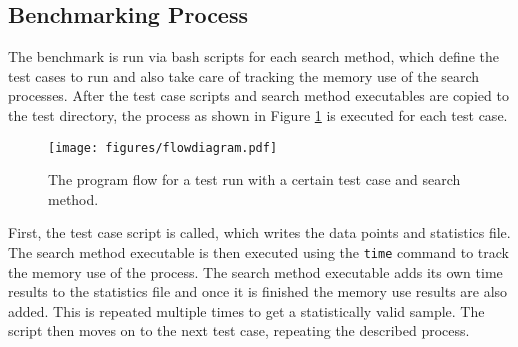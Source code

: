 \subsection{Benchmarking Process}

The benchmark is run via bash scripts for each search method, which define the test cases to run and also take care of tracking the memory use of the search processes. After the test case scripts and search method executables are copied to the test directory, the process as shown in Figure \ref{FIG:BENCHMARKING} is executed for each test case.

\begin{figure}[h]
	\centering
	\texttt{[image: figures/flowdiagram.pdf]}
	\caption{The program flow for a test run with a certain test case and search method.}
	\label{FIG:BENCHMARKING}
\end{figure}

First, the test case script is called, which writes the data points and statistics file. The search method executable is then executed using the \texttt{time} command to track the memory use of the process. The search method executable adds its own time results to the statistics file and once it is finished the memory use results are also added. This is repeated multiple times to get a statistically valid sample. The script then moves on to the next test case, repeating the described process.

